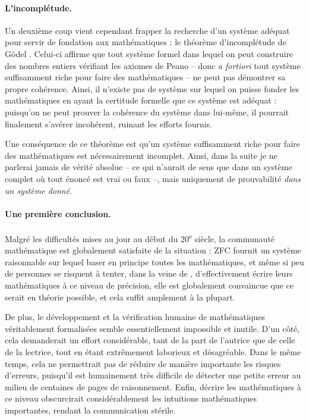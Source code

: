 \paragraph{L’incomplétude.}
Un deuxième coup vient cependant frapper la recherche d’un système adéquat pour
servir de fondation aux mathématiques : le théorème d’incomplétude de Gödel
\cite{incomplétude}. Celui-ci affirme que tout système formel dans lequel on peut
construire des nombres entiers vérifiant les axiomes de Peano – donc
\textit{a fortiori} tout système suffisamment riche pour faire des mathématiques –
ne peut pas démontrer sa propre cohérence. Ainsi, il n’existe pas de
système sur lequel on puisse fonder les mathématiques en ayant la certitude
formelle que ce système est adéquat : puisqu’on ne peut prouver la cohérence du
système dans lui-même, il pourrait finalement s’avérer incohérent, ruinant les
efforts fournis.

Une conséquence de ce théorème est qu’un système suffisamment riche
pour faire des mathématiques est nécessairement incomplet.
Ainsi, dans la suite je ne parlerai jamais de vérité absolue –
ce qui n’aurait de sens que dans un système complet
où tout énoncé est vrai ou faux –, mais
uniquement de prouvabilité \emph{dans un système donné}.

\paragraph{Une première conclusion.}
Malgré les difficultés mises au jour au début du 20\textsuperscript{e}
siècle, la communauté mathématique est globalement
satisfaite de la situation : ZFC fournit un système raisonnable sur
lequel baser en principe toutes les mathématiques, et même si peu de
personnes se risquent à tenter, dans la veine de \cite{Principia},
d’effectivement écrire leurs mathématiques à ce niveau de précision,
elle est globalement convaincue que ce serait en théorie
possible, et cela suffit amplement à la plupart.

De plus, le développement et la vérification humaine de mathématiques véritablement
formalisées semble essentiellement impossible et inutile.
D’un côté, cela demanderait un effort considérable,
tant de la part de l’autrice que de celle de la lectrice, tout en étant
extrêmement laborieux et désagréable.
Dans le même temps, cela ne permettrait pas de réduire de manière importante
les risques d’erreurs, puisqu’il est
humainement très difficile de détecter une petite erreur au milieu de centaines de pages de raisonnement.
Enfin, décrire les mathématiques à ce niveau obscurcirait
considérablement les intuitions mathématiques importantes,
rendant la communication stérile.

